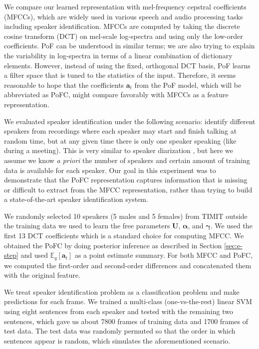 \documentclass{article} %
\begin{document}
We compare our learned representation with mel-frequency cepstral
coefficients (MFCCs), which are widely used in various speech and
audio processing tasks including speaker identification. MFCCs are
computed by taking the discrete cosine transform (DCT) on mel-scale
log-spectra and using only the low-order coefficients. PoF can be
understood in similar terms; we are also trying to explain the
variability in log-spectra in terms of a linear combination of
dictionary elements. However, instead of using the fixed, orthogonal
DCT basis, PoF learns a filter space that is tuned to the statistics
of the input. Therefore, it seems reasonable to hope that the
coefficients $\bm{a}_t$ from the PoF model, which will be abbreviated
as PoFC, might compare favorably with MFCCs as a feature
representation.

We evaluated speaker identification under the following scenario: identify different speakers from recordings where each speaker may start and finish talking at random time, but at any given time there is only one speaker speaking (like during a meeting). This is very
similar to speaker diarization \cite{Fox:AOAS2011}, but here we assume
we know \emph{a priori} the number of speakers and certain amount of training data is available for each speaker.  Our goal in this experiment was to demonstrate that
the PoFC representation captures information that is missing or difficult to extract from the MFCC
representation, rather than trying to build a state-of-the-art speaker identification system.

We randomly selected 10 speakers (5 males and 5 females) from TIMIT outside the training data we used to learn the free parameters $\mathbf{U}$, $\bm{\alpha}$, and $\bm{\gamma}$. We used the first 13 DCT coefficients which is a standard choice for computing MFCC. We obtained the PoFC by doing posterior inference as described in Section \ref{sec:e-step} and used $\mathbb{E}_q[\bm{a}_t]$ as a point estimate summary. For both MFCC and PoFC, we computed the first-order and second-order differences and concatenated them with the original feature. 

We treat speaker identification problem as a classification problem
and make predictions for each frame. We trained a multi-class
(one-vs-the-rest) linear SVM using eight sentences from each speaker
and tested with the remaining two sentences, which gave us about 7800
frames of training data and 1700 frames of test data. The test
data was randomly permuted so that the order in which sentences appear
is random, which simulates the aforementioned scenario.
\end{document}
